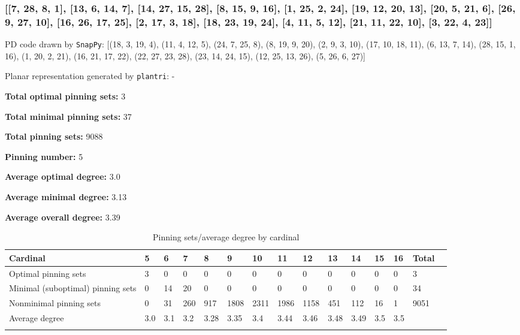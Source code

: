 \documentclass{article}%
\begin{document}
\newpage

\subsubsection{[[7, 28, 8, 1], [13, 6, 14, 7], [14, 27, 15, 28], [8, 15, 9, 16], [1, 25, 2, 24], [19, 12, 20, 13], [20, 5, 21, 6], [26, 9, 27, 10], [16, 26, 17, 25], [2, 17, 3, 18], [18, 23, 19, 24], [4, 11, 5, 12], [21, 11, 22, 10], [3, 22, 4, 23]]}

{\small\noindent PD code drawn by \texttt{SnapPy}: [(18, 3, 19, 4), (11, 4, 12, 5), (24, 7, 25, 8), (8, 19, 9, 20), (2, 9, 3, 10), (17, 10, 18, 11), (6, 13, 7, 14), (28, 15, 1, 16), (1, 20, 2, 21), (16, 21, 17, 22), (22, 27, 23, 28), (23, 14, 24, 15), (12, 25, 13, 26), (5, 26, 6, 27)]}

{\small\noindent Planar representation generated by \texttt{plantri}: -}

\begin{multicols}{2}
{\normalsize \noindent\textbf{Total optimal pinning sets:} 3

\noindent\textbf{Total minimal pinning sets:} 37

\noindent\textbf{Total pinning sets:} 9088

\noindent\textbf{Pinning number:} 5

}
\columnbreak

{\normalsize \noindent\textbf{Average optimal degree:} 3.0

\noindent\textbf{Average minimal degree:} 3.13

\noindent\textbf{Average overall degree:} 3.39

}
\end{multicols}

\begin{table}[ht]
	\caption{Pinning sets/average degree by cardinal}
	\centering
	\renewcommand{\arraystretch}{1.5}
	\begin{tabularx}{\textwidth}{lXXXXXXXXXXXXXX}
		\toprule
			Cardinal & 5 & 6 & 7 & 8 & 9 & 10 & 11 & 12 & 13 & 14 & 15 & 16 & Total\\
			\hline
			Optimal pinning sets & 3 & 0 & 0 & 0 & 0 & 0 & 0 & 0 & 0 & 0 & 0 & 0 & 3 \\
			Minimal (suboptimal) pinning sets & 0 & 14 & 20 & 0 & 0 & 0 & 0 & 0 & 0 & 0 & 0 & 0 & 34 \\
			Nonminimal pinning sets & 0 & 31 & 260 & 917 & 1808 & 2311 & 1986 & 1158 & 451 & 112 & 16 & 1 & 9051 \\
			Average degree & 3.0 & 3.1 & 3.2 & 3.28 & 3.35 & 3.4 & 3.44 & 3.46 & 3.48 & 3.49 & 3.5 & 3.5 &  \\
		\bottomrule \\ 
	\end{tabularx}
\end{table}
\end{document}
